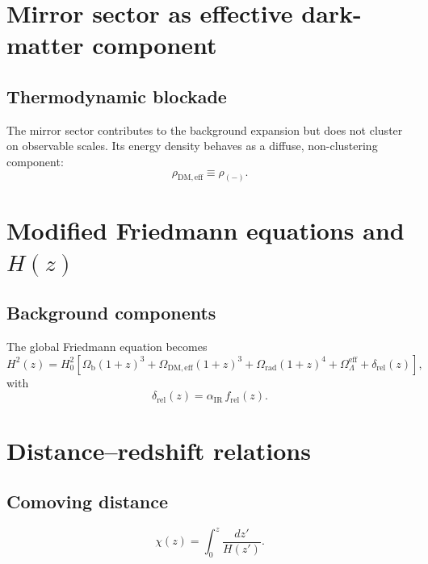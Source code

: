 \documentclass[11pt,a4paper]{article}
\begin{document}
\section{Mirror sector as effective dark-matter component}

\subsection{Thermodynamic blockade}

The mirror sector contributes to the background expansion but does not
cluster on observable scales. Its energy density behaves as a diffuse,
non-clustering component:
\begin{equation}
  \rho_{\mathrm{DM,eff}} \equiv \rho_{(-)}.
\end{equation}

\section{Modified Friedmann equations and \texorpdfstring{\(H(z)\)}{H(z)}}

\subsection{Background components}

The global Friedmann equation becomes
\begin{equation}
  H^{2}(z)
  =
  H_0^{2}
  \left[
    \Omega_{\mathrm{b}}(1+z)^{3}
    +
    \Omega_{\mathrm{DM,eff}}(1+z)^{3}
    +
    \Omega_{\mathrm{rad}}(1+z)^{4}
    +
    \Omega_{\Lambda}^{\mathrm{eff}}
    +
    \delta_{\mathrm{rel}}(z)
  \right],
  \label{eq:Hofz}
\end{equation}
with
\begin{equation}
  \delta_{\mathrm{rel}}(z)
  =
  \alpha_{\mathrm{IR}}\, f_{\mathrm{rel}}(z).
\end{equation}

\section{Distance--redshift relations}

\subsection{Comoving distance}

\begin{equation}
  \chi(z)
  =
  \int_0^{z} \frac{dz'}{H(z')}.
\end{equation}
\end{document}
